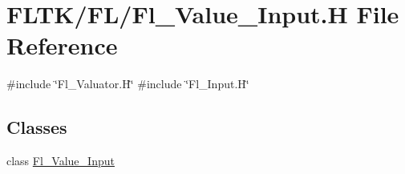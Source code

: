 \hypertarget{_fl___value___input_8_h}{}\section{F\+L\+T\+K/\+F\+L/\+Fl\+\_\+\+Value\+\_\+\+Input.H File Reference}
\label{_fl___value___input_8_h}
{\ttfamily \#include \char`\"{}Fl\+\_\+\+Valuator.\+H\char`\"{}}\newline
{\ttfamily \#include \char`\"{}Fl\+\_\+\+Input.\+H\char`\"{}}\newline
\subsection*{Classes}
\begin{DoxyCompactItemize}
\item 
class \hyperlink{class_fl___value___input}{Fl\+\_\+\+Value\+\_\+\+Input}
\end{DoxyCompactItemize}
